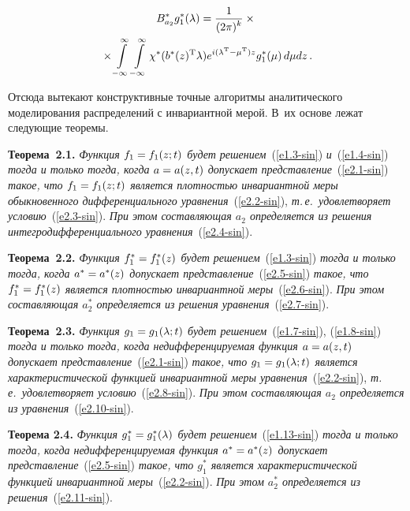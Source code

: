 \begin{multicols}{2}
\vspace*{-16pt}

\noindent
\begin{multline}
B_{a_2}^* g_1^*(\lambda) 
= \displaystyle\frac{\displaystyle 1\mathstrut}{\displaystyle (2\pi)^k\mathstrut} \times{}\\
{}\times\int\limits_{-\infty}^\infty\int\limits_{-\infty}^\infty 
\chi^*(b^*(z)^{\mathrm{T}} \lambda) e^{i(\lambda^{\mathrm{T}}-\mu^{\mathrm{T}})z} g_1^*(\mu)\, d\mu dz\,.
\label{e2.11-sin}
\end{multline}

Отсюда вытекают конструктивные точные алгоритмы аналитического
моделирования распределений с инвариантной мерой. В~их основе лежат
следующие теоремы.


\medskip

\noindent
\textbf{Теорема~2.1.} \textit{Функция $f_1\hm=f_1(z;t)$ будет решением}~(\ref{e1.3-sin})
\textit{и}~(\ref{e1.4-sin}) \textit{тогда и только тогда, когда $a\hm=a(z,t)$ допускает
представление}~(\ref{e2.1-sin}) \textit{такое, что $f_1\hm=f_1(z;t)$ является плотностью
инвариантной меры обыкновенного дифференциального уравнения}~(\ref{e2.2-sin}),
\textit{т.\,е.\ удовле\-тво\-ря\-ет условию}~(\ref{e2.3-sin}). \textit{При этом со\-став\-ля\-ющая $a_2$
определяется из решения интегродифференциального уравнения}~(\ref{e2.4-sin}).

\medskip

\noindent
\textbf{Теорема~2.2.} \textit{Функция $f_1^*\hm=f_1^*(z)$ будет решением}~(\ref{e1.3-sin}) 
\textit{тогда и только тогда, когда $a^*\hm=a^*(z)$ допускает
представление}~(\ref{e2.5-sin}) \textit{такое, что $f_1^*\hm=f_1^*(z)$ является плотностью
инвариантной меры}~(\ref{e2.6-sin}). \textit{При этом составляющая $a_2^{*}$
определяется из решения  уравнения}~(\ref{e2.7-sin}).

\medskip

\noindent
\textbf{Теорема~2.3.} \textit{Функция $g_1\hm=g_1(\la;t)$ будет ре\-ше\-нием}~(\ref{e1.7-sin}), 
(\ref{e1.8-sin}) \textit{тогда и только тогда, когда недиф\-фе\-ренцируемая функция
$a\hm=a(z,t)$  допускает пред\-став\-ление}~(\ref{e2.1-sin}) \textit{такое, что
$g_1\hm=g_1(\la;t)$ является ха\-рак\-теристической функцией инвариантной
меры \mbox{уравнения}}~(\ref{e2.2-sin}), \textit{т.\,е.\ удовлетворяет условию}~(\ref{e2.8-sin}). 
\textit{При этом составляющая $a_2$ определяется из уравнения}~(\ref{e2.10-sin}).

\medskip

\noindent
\textbf{Теорема 2.4.} \textit{Функция $g_1^*\hm=g_1^*(\la)$  будет решением}~(\ref{e1.13-sin}) 
\textit{тогда и только тогда, когда недифференцируемая функция $a^*\hm=a^*(z)$  
допускает представление}~(\ref{e2.5-sin}) \textit{такое, что $g_1^*$ является  
характеристической функцией инвариантной меры}~(\ref{e2.2-sin}). 
\textit{При этом $a_2^*$ определяется из решения}~(\ref{e2.11-sin}).


\end{multicols}
